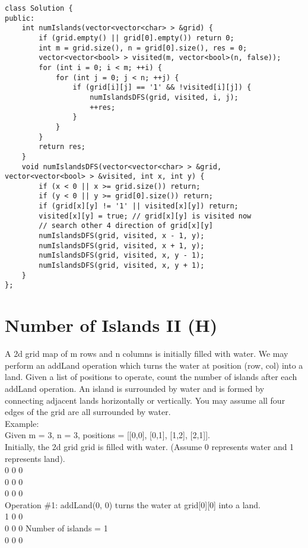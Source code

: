 \begin{lstlisting}
class Solution {
public:
    int numIslands(vector<vector<char> > &grid) {
        if (grid.empty() || grid[0].empty()) return 0;
        int m = grid.size(), n = grid[0].size(), res = 0;
        vector<vector<bool> > visited(m, vector<bool>(n, false));
        for (int i = 0; i < m; ++i) {
            for (int j = 0; j < n; ++j) {
                if (grid[i][j] == '1' && !visited[i][j]) {
                    numIslandsDFS(grid, visited, i, j);
                    ++res;
                }
            }
        }
        return res;
    }
    void numIslandsDFS(vector<vector<char> > &grid, vector<vector<bool> > &visited, int x, int y) {
        if (x < 0 || x >= grid.size()) return;
        if (y < 0 || y >= grid[0].size()) return;
        if (grid[x][y] != '1' || visited[x][y]) return;
        visited[x][y] = true; // grid[x][y] is visited now
        // search other 4 direction of grid[x][y]
        numIslandsDFS(grid, visited, x - 1, y);
        numIslandsDFS(grid, visited, x + 1, y);
        numIslandsDFS(grid, visited, x, y - 1);
        numIslandsDFS(grid, visited, x, y + 1);
    }
};
\end{lstlisting}


\section{Number of Islands II (H)}
A 2d grid map of m rows and n columns is initially filled with water. We may perform an addLand operation which turns the water at position (row, col) into a land. Given a list of positions to operate, count the number of islands after each addLand operation. An island is surrounded by water and is formed by connecting adjacent lands horizontally or vertically. You may assume all four edges of the grid are all surrounded by water. \\

Example:\\
Given m = 3, n = 3, positions = [[0,0], [0,1], [1,2], [2,1]].\\

Initially, the 2d grid grid is filled with water. (Assume 0 represents water and 1 represents land).\\
0 0 0\\
0 0 0\\
0 0 0\\

Operation \#1: addLand(0, 0) turns the water at grid[0][0] into a land.\\
1 0 0\\
0 0 0   Number of islands = 1\\
0 0 0\\

